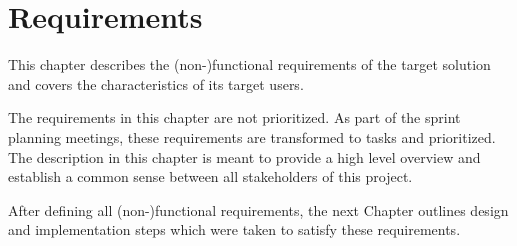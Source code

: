 
\chapter{Requirements}
\label{cha:requirements}


This chapter describes the (non-)functional requirements of the target solution and covers the characteristics of its target users. 

The requirements in this chapter are not prioritized. As part of the sprint planning meetings, these requirements are transformed to tasks and prioritized. The description in this chapter is meant to provide a high level overview and establish a common sense between all stakeholders of this project.







\bigskip

After defining all (non-)functional requirements, the next Chapter outlines design and implementation steps which were taken to satisfy these requirements.

